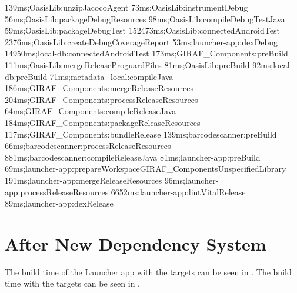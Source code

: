 \begin{gradlecode}[caption=Running time of tasks of old dependency system,label=lst:full_data_old_dep_system]
139ms;OasisLib:unzipJacocoAgent
73ms;OasisLib:instrumentDebug
56ms;OasisLib:packageDebugResources
98ms;OasisLib:compileDebugTestJava
59ms;OasisLib:packageDebugTest
152473ms;OasisLib:connectedAndroidTest
2376ms;OasisLib:createDebugCoverageReport
53ms;launcher-app:dexDebug
14950ms;local-db:connectedAndroidTest
173ms;GIRAF_Components:preBuild
111ms;OasisLib:mergeReleaseProguardFiles
81ms;OasisLib:preBuild
92ms;local-db:preBuild
71ms;metadata_local:compileJava
186ms;GIRAF_Components:mergeReleaseResources
204ms;GIRAF_Components:processReleaseResources
64ms;GIRAF_Components:compileReleaseJava
184ms;GIRAF_Components:packageReleaseResources
117ms;GIRAF_Components:bundleRelease
139ms;barcodescanner:preBuild
66ms;barcodescanner:processReleaseResources
881ms;barcodescanner:compileReleaseJava
81ms;launcher-app:preBuild
69ms;launcher-app:prepareWorkspaceGIRAF_ComponentsUnspecifiedLibrary
191ms;launcher-app:mergeReleaseResources
96ms;launcher-app:processReleaseResources
6652ms;launcher-app:lintVitalRelease
89ms;launcher-app:dexRelease
\end{gradlecode}

\section{After New Dependency System}
The build time of the Launcher app with the targets  can be seen in . The build time with the targets  can be seen in .

